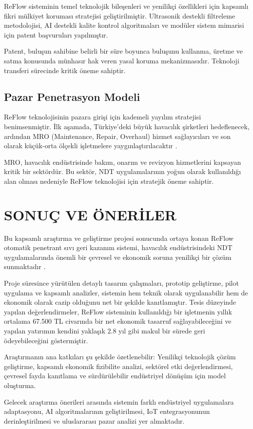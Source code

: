 \documentclass[12pt,a4paper]{article}
\begin{document}
ReFlow sisteminin temel teknolojik bileşenleri ve yenilikçi özellikleri için kapsamlı fikri mülkiyet koruması stratejisi geliştirilmiştir. Ultrasonik destekli filtreleme metodolojisi, AI destekli kalite kontrol algoritmaları ve modüler sistem mimarisi için patent başvuruları yapılmıştır.

Patent, buluşun sahibine belirli bir süre boyunca buluşunu kullanma, üretme ve satma konusunda münhasır hak veren yasal koruma mekanizmasıdır. Teknoloji transferi sürecinde kritik öneme sahiptir.

\subsection{Pazar Penetrasyon Modeli}

ReFlow teknolojisinin pazara girişi için kademeli yayılım stratejisi benimsenmiştir. İlk aşamada, Türkiye'deki büyük havacılık şirketleri hedeflenecek, ardından MRO (Maintenance, Repair, Overhaul) hizmet sağlayıcıları ve son olarak küçük-orta ölçekli işletmelere yaygınlaştırılacaktır \cite{mueller2021circular}.

MRO, havacılık endüstrisinde bakım, onarım ve revizyon hizmetlerini kapsayan kritik bir sektördür. Bu sektör, NDT uygulamalarının yoğun olarak kullanıldığı alan olması nedeniyle ReFlow teknolojisi için stratejik öneme sahiptir.

\section{SONUÇ VE ÖNERİLER}

Bu kapsamlı araştırma ve geliştirme projesi sonucunda ortaya konan ReFlow otomatik penetrant sıvı geri kazanım sistemi, havacılık endüstrisindeki NDT uygulamalarında önemli bir çevresel ve ekonomik soruna yenilikçi bir çözüm sunmaktadır \cite{christensen2016innovator}.

Proje süresince yürütülen detaylı tasarım çalışmaları, prototip geliştirme, pilot uygulama ve kapsamlı analizler, sistemin hem teknik olarak uygulanabilir hem de ekonomik olarak cazip olduğunu net bir şekilde kanıtlamıştır. Tesis düzeyinde yapılan değerlendirmeler, ReFlow sisteminin kullanıldığı bir işletmenin yıllık ortalama 67.500 TL civarında bir net ekonomik tasarruf sağlayabileceğini ve yapılan yatırımın kendini yaklaşık 2.8 yıl gibi makul bir sürede geri ödeyebileceğini göstermiştir.

Araştırmanın ana katkıları şu şekilde özetlenebilir: Yenilikçi teknolojik çözüm geliştirme, kapsamlı ekonomik fizibilite analizi, sektörel etki değerlendirmesi, çevresel fayda kanıtlama ve sürdürülebilir endüstriyel dönüşüm için model oluşturma.

Gelecek araştırma önerileri arasında sistemin farklı endüstriyel uygulamalara adaptasyonu, AI algoritmalarının geliştirilmesi, IoT entegrasyonunun derinleştirilmesi ve uluslararası pazar analizi yer almaktadır.

\newpage


\end{document}
